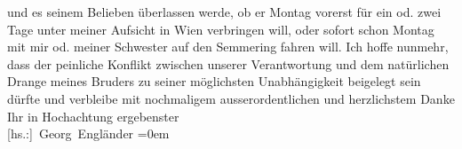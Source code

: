 \begin{ledgroupsized}[t]{13cm}
                    und es seinem Belieben überlassen werde, ob er Montag vorerst für
                    ein od. zwei Tage unter meiner Aufsicht in Wien
                    verbringen will, oder sofort schon Montag mit mir od. meiner Schwester auf den Semmering fahren will.\pend
           \pstart
           Ich hoffe nunmehr, dass der peinliche Konflikt zwischen unserer Verantwortung und
                    dem natürlichen Drange meines Bruders zu seiner möglichsten Unabhängigkeit beigelegt sein dürfte und
                    verbleibe mit nochmaligem ausserordentlichen und herzlichstem Danke Ihr in\pend
           \pstart
           Hochachtung ergebenster{\\[\baselineskip]}\spacefill\mbox{{[}hs.:{]} Georg
                    Engländer}\pend
           \leftskip=0em{}\endnumbering{}\end{ledgroupsized}  \newcommand{\dateiname}{L02131}\newcommand{\titel}{Georg Engländer an Arthur Schnitzler, 25. 4. 1913}\newcommand{\editorInnen}{Martin Anton Müller und Gerd-Hermann Susen}
      